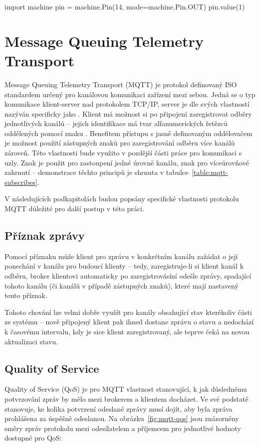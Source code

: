 \begin{code}[language=Python,caption={Ukázka práce }]
    import machine
    pin = machine.Pin(14, mode=machine.Pin.OUT)
    pin.value(1)
\end{code}


\section{Message Queuing Telemetry Transport}\label{sec:mqtt}
Message Queuing Telemetry Transport (MQTT) je protokol definovaný ISO standardem určený pro kanálovou komunikaci zařízení
mezi sebou.
Jedná se o typ komunikace klient-server nad protokolem TCP/IP, server je dle svých vlastností nazýván specificky jako .
Klient má možnost si po připojení zaregistrovat odběry jednotlivých kanálů -- jejich identifikace má tvar
alfanumerických řetězců oddělených pomocí znaku \ic{/}.
Benefitem přístupu s jasně definovaným oddělovačem je možnost použití zástupných znaků pro
zaregistrování odběru více kanálů zároveň.
Této vlastnosti bude využito v pozdější části práce pro komunikaci s uzly.
Znak \ic{+} je použit pro zastoupení jedné úrovně kanálu, znak \ic{#} pro víceúrovňové zahrnutí -- demonstrace těchto
principů je shrnuta v tabulce~\ref{table:mqtt-subscribes}.

V následujících podkapitolách budou popsány specifické vlastnosti protokolu MQTT důležité pro další postup v této
práci.

\subsection{Příznak zprávy }\label{subsec:priznak-zpravy-retain}
Pomocí příznaku  může klient pro zprávu v konkrétním kanálu zažádat o její ponechání v kanálu pro budoucí
klienty -- tedy, zaregistruje-li si klient kanál k odběru, broker klientovi automaticky po zaregistrovásíní odešle
zprávy,
spadající tohoto kanálu (či kanálů v případě zástupných znaků), které mají nastavený tento příznak.

Tohoto chování lze velmi dobře využít pro kanály obsahující stav kterékoliv části ze systému --
nově připojený klient pak ihned dostane zprávu o stavu a nedochází k časovému intervalu, kdy je sice klient
zaregistrovaný, ale teprve čeká na novou aktualizaci stavu.

\subsection{Quality of Service}\label{subsec:quality-of-service}
Quality of Service (QoS) je pro MQTT vlastnost stanovující, k jak důslednému potvrzování zpráv by mělo mezi
brokerem a klientem docházet.
Ve své podstatě stanovuje, ke kolika potvrzení odeslané zprávy musí dojít, aby byla
zpráva prohlášena za úspěšně odeslanou.
Na obrázku~\ref{fig:mqtt-qos} jsou znázorněny směry zpráv protokolu mezi odesílatelem a příjemcem pro jednotlivé
hodnoty dostupné pro QoS:

